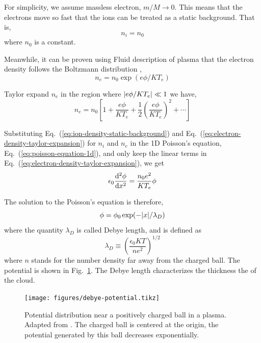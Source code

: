 For simplicity, we assume massless electron, $m/M \to 0$. This means that the electrons move so fast that the ions can be treated as a static background. That is,
\begin{equation}
	n_i = n_0
	\label{eq:ion-density-static-background}
\end{equation}
where $n_0$ is a constant.

Meanwhile, it can be proven using Fluid description of plasma that the electron density follows the Boltzmann distribution \cite{chen_introduction_2016},
\begin{equation}
	n_e = n_0\exp(e\phi/KT_e)
\end{equation}

Taylor expand $n_e$ in the region where $\abs{e\phi/KT_e} \ll 1$ we have,
\begin{equation}
	n_e = n_0\left[ 1 + \frac{e\phi}{KT_e} + \frac{1}{2}\left(\frac{e\phi}{KT_e}\right)^2 + \cdots \right]
	\label{eq:electron-density-taylor-expansion}
\end{equation}

Substituting Eq.~(\ref{eq:ion-density-static-background}) and Eq.~(\ref{eq:electron-density-taylor-expansion}) for $n_i$ and $n_e$ in the 1D Poisson's equation, Eq.~(\ref{eq:poisson-equation-1d}), and only keep the linear terms in Eq.~(\ref{eq:electron-density-taylor-expansion}), we get
\begin{equation}
	\epsilon_0\dv[2]{\phi}{x} = \frac{n_0e^2}{KT_e}\phi
\end{equation}

The solution to the Poisson's equation is therefore,
\begin{equation}
	\phi = \phi_0\exp(-\abs{x}/\lambda_D)
\end{equation}
where the quantity $\lambda_D$ is called Debye length, and is defined as
\begin{equation}
	\lambda_D \equiv \left(\frac{\epsilon_0 KT}{ne^2}\right)^{1/2}
	\label{eq:debye-length}
\end{equation}
where $n$ stands for the number density far away from the charged ball. The potential is shown in Fig.~\ref{fig:debye-potential}. The  Debye length characterizes the thickness the of the cloud.

\begin{figure}[htbp]
	\centering
	\texttt{[image: figures/debye-potential.tikz]}
	\caption{Potential distribution near a positively charged ball in a plasma. Adapted from \cite{chen_introduction_2016}. The charged ball is centered at the origin, the potential generated by this ball decreases exponentially.}
	\label{fig:debye-potential}
\end{figure}

